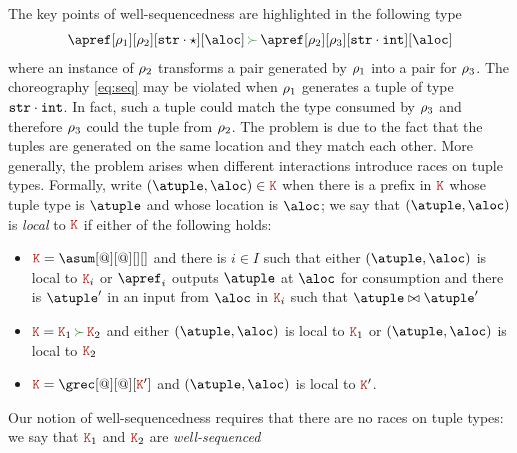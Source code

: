 %
% 
%

\bigskip

The key points of well-sequencedness are highlighted in 
the following type
\begin{align}\label{eq:seq}
  \apref[\arole_1][\arole_2][{\asort[str] \cdot \wildcard}][\aloc] \seqop
  \apref[\arole_2][\arole_3][{\asort[str] \cdot \asort[int]}][\aloc]
\end{align}
%
where an instance of $\arole_2$ transforms a pair generated by
$\arole_1$ into a pair for $\arole_3$.
%
The choreography \eqref{eq:seq} may be violated when
$\arole_1$ generates a tuple of type $\asort[str] \cdot \asort[int]$.
%
In fact, such a tuple could match the type consumed by $\arole_3$ and
therefore $\arole_3$ could  the tuple from $\arole_2$.
%
The problem is due to the fact that the tuples are generated on the same location and they match each other.
%
More generally, the problem arises when different interactions introduce races on tuple types. Formally, write $(\atuple, \aloc) \in \aK$ when there is a
prefix in $\aK$ whose tuple type is $\atuple$ and whose location is
$\aloc$; we say that $(\atuple, \aloc)$ is \emph{local} to $\aK$ if
either of the following holds:
\begin{itemize}
\item $\aK = \asum[@][@][][]$ and there is $i \in I$ such that either
  $(\atuple, \aloc)$ is local to $\aK_i$ or $\apref_i$ outputs
  $\atuple$ at $\aloc$ for consumption and  there is $\atuple'$ in an
  input from $\aloc$ in $\aK_i$ such that $\atuple \matches \atuple'$
\item $\aK = \aK_1 \seqop \aK_2$ and either $(\atuple, \aloc)$ is local to
  $\aK_1$ or   $(\atuple, \aloc)$ is local to $\aK_2$
\item $\aK = \grec[@][@][\aK']$ and $(\atuple, \aloc)$ is local to
  $\aK'$.
\end{itemize}
%
Our notion of well-sequencedness requires that there are no races on
tuple types: we say that $\aK_1$ and $\aK_2$ are \emph{well-sequenced}
